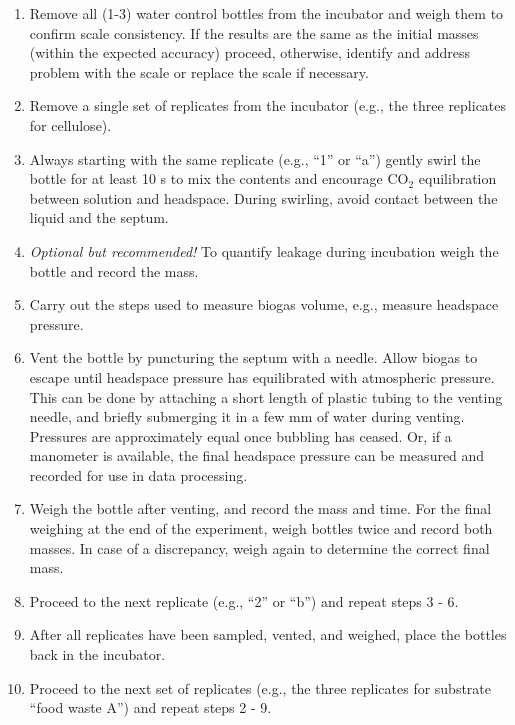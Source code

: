 \documentclass[]{article}
\begin{document}
\begin{enumerate}
    \item Remove all (1-3) water control bottles from the incubator and weigh them to confirm scale consistency. If the results are the same as the initial masses (within the expected accuracy) proceed, otherwise, identify and address problem with the scale or replace the scale if necessary.
    \item Remove a single set of replicates from the incubator (e.g., the three replicates for cellulose).
    \item Always starting with the same replicate (e.g., “1” or “a”) gently swirl the bottle for at least 10 s to mix the contents and encourage CO$_2$ equilibration between solution and headspace. During swirling, avoid contact between the liquid and the septum. 
    \item \textit{Optional but recommended!} To quantify leakage during incubation weigh the bottle and record the mass.
    \item Carry out the steps used to measure biogas volume, e.g., measure headspace pressure. 
    \item Vent the bottle by puncturing the septum with a needle. Allow biogas to escape until headspace pressure has equilibrated with atmospheric pressure. This can be done by attaching a short length of plastic tubing to the venting needle, and briefly submerging it in a few mm of water during venting. Pressures are approximately equal once bubbling has ceased. Or, if a manometer is available, the final headspace pressure can be measured and recorded for use in data processing.
    \item Weigh the bottle after venting, and record the mass and time. For the final weighing at the end of the experiment, weigh bottles twice and record both masses. In case of a discrepancy, weigh again to determine the correct final mass.
    \item Proceed to the next replicate (e.g., “2” or “b”) and repeat steps 3 - 6.
    \item After all replicates have been sampled, vented, and weighed, place the bottles back in the incubator.
    \item Proceed to the next set of replicates (e.g., the three replicates for substrate “food waste A”) and repeat steps 2 - 9.
\end{enumerate}
\end{document}
